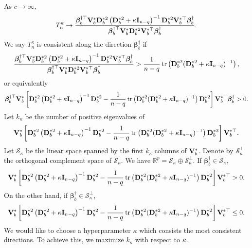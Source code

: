 \documentclass[11pt]{article}
\DeclareMathOperator{\mytr}{tr}
\newcommand{\bfsym}[1]{\ensuremath{\boldsymbol{#1}}}
\def\bbeta{\bfsym \beta}
\theoremstyle{plain}
\theoremstyle{definition}
\theoremstyle{remark}
\begin{document}
As $c \to \infty$, 
\begin{equation*}
T_n^\kappa \to
\frac{
    \bbeta_b^{\dagger \top} \BV_b^* \BD_b^{*2} \left( \BD_b^{*2} + \kappa \BI_{n-q} \right)^{-1} \BD_b^{*2} \BV_b^{*\top} \bbeta_b^{\dagger}
}{
    \bbeta_b^{\dagger \top} \BV_b^* \BD_b^{*2} \BV_b^{*\top} \bbeta_b^{\dagger}
}
.
\end{equation*}
We say $T_{n}^\kappa$ is consistent along the direction $\bbeta_b^\dagger$ if
\begin{equation*}
\frac{
    \bbeta_b^{\dagger \top} \BV_b^* \BD_b^{*2} \left( \BD_b^{*2} + \kappa \BI_{n-q} \right)^{-1} \BD_b^{*2} \BV_b^{*\top} \bbeta_b^{\dagger}
}{
    \bbeta_b^{\dagger \top} \BV_b^* \BD_b^{*2} \BV_b^{*\top} \bbeta_b^{\dagger}
}
>
\frac{1}{n-q} \mytr \left( \BD_b^{*2} ( \BD_b^{*2} + \kappa \BI_{n-q})^{-1}\right),
\end{equation*}
or equivalently
\begin{equation*}
    \bbeta_b^{\dagger \top} \BV_b^*
\left[
    \BD_b^{*2} \left( \BD_b^{*2} + \kappa \BI_{n-q} \right)^{-1} \BD_b^{*2} 
-\frac{1}{n-q} \mytr \left( \BD_b^{*2} ( \BD_b^{*2} + \kappa \BI_{n-q})^{-1}\right)
     \BD_b^{*2} 
\right]
    \BV_b^{*\top} \bbeta_b^{\dagger}
    >0.
\end{equation*}
Let $k_{\kappa}$ be the number of positive eigenvalues of
\begin{equation*}
    \BV_b^*
\left[
    \BD_b^{*2} \left( \BD_b^{*2} + \kappa \BI_{n-q} \right)^{-1} \BD_b^{*2} 
-\frac{1}{n-q} \mytr \left( \BD_b^{*2} ( \BD_b^{*2} + \kappa \BI_{n-q})^{-1}\right)
     \BD_b^{*2} 
\right]
\BV_b^{*\top}.
\end{equation*}
Let $\mathcal S_{\kappa}$ be the linear space spanned by the first $k_{\kappa}$ columns of $\mathbf{V}_{b}^*$.
Denote by $\mathcal S_{\kappa}^{\bot}$ the orthogonal complement space of $\mathcal S_\kappa$.
We have $\mathbb R^p=\mathcal S_\kappa \oplus \mathcal  S_{\kappa}^{\bot}$.
If $\bbeta_b^\dagger \in \mathcal S_\kappa$,
\begin{equation*}
    \BV_b^*
\left[
    \BD_b^{*2} \left( \BD_b^{*2} + \kappa \BI_{n-q} \right)^{-1} \BD_b^{*2} 
-\frac{1}{n-q} \mytr \left( \BD_b^{*2} ( \BD_b^{*2} + \kappa \BI_{n-q})^{-1}\right)
     \BD_b^{*2} 
\right]
\BV_b^{*\top}>0.
\end{equation*}
On the other hand, if $\bbeta_b^\dagger \in \mathcal S_{\kappa}^\bot$,
\begin{equation*}
    \BV_b^*
\left[
    \BD_b^{*2} \left( \BD_b^{*2} + \kappa \BI_{n-q} \right)^{-1} \BD_b^{*2} 
-\frac{1}{n-q} \mytr \left( \BD_b^{*2} ( \BD_b^{*2} + \kappa \BI_{n-q})^{-1}\right)
     \BD_b^{*2} 
\right]
\BV_b^{*\top}\leq 0.
\end{equation*}
We would like to choose a hyperparameter $\kappa$ which consists the most consistent directions.
To achieve this, we maximize $k_{\kappa}$ with respect to $\kappa$.
\end{document}
